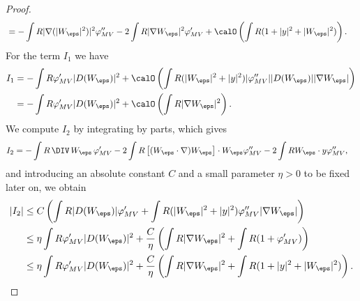 \begin{proof}
\begin{align*}
& = - \int R |\nabla (|W_\eps|^2)|^2 \varphi''_{MV} - 2\int R |\nabla W_\eps|^2 \varphi'_{MV} +\calO\left(\int R (1+ |y|^2 + |W_\eps|^2) \right).
\end{align*}
For the term $I_1$ we have
\begin{align*}
I_1 & = - \int R \varphi'_{MV}|D(W_\eps)|^2 + \calO\left(\int R (|W_\eps|^2+ |y|^2) |\varphi''_{MV}| |D(W_\eps)| |\nabla W_\eps|\right) \\
& = - \int R \varphi'_{MV}|D(W_\eps)|^2 + \calO\left(\int R |\nabla W_\eps|^2\right).
\end{align*}
We compute $I_{2}$ by integrating by parts, which gives
\begin{align*}
I_{2} & = - \int R \, \DIV \, W_\eps \, \varphi'_{MV} - 2\int R
\left[(W_\eps \cdot \nabla) W_\eps \right] \cdot W_\eps
\varphi''_{MV} -2 \int R W_\eps \cdot y \varphi''_{MV},
\end{align*}
and introducing an absolute constant $C$ and a small parameter $\eta >0$ to be fixed later on, we obtain
\begin{align*}
|I_{2}|& \le C\left(\int R |D(W_\eps)| \varphi'_{MV} + \int R (|W_\eps|^2 + |y|^2) \varphi''_{MV} |\nabla W_\eps|\right) \\
& \le \eta \int R \varphi'_{MV} |D(W_\eps)|^2 + \dfrac{C}{\eta} \left(\int R |\nabla W_\eps|^2 + \int R (1+ \varphi'_{MV})\right) \\
& \le \eta \int R \varphi'_{MV} |D(W_\eps)|^2 + \dfrac{C}{\eta} \left(\int R |\nabla W_\eps|^2 + \int R (1+ |y|^2 + |W_\eps|^2) \right).
\end{align*}


\end{proof}
